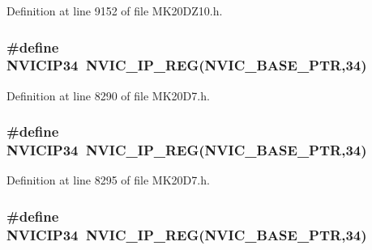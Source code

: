 Definition at line 9152 of file M\+K20\+D\+Z10.\+h.

\subsubsection[{\texorpdfstring{N\+V\+I\+C\+I\+P34}{NVICIP34}}]{\setlength{\rightskip}{0pt plus 5cm}\#define N\+V\+I\+C\+I\+P34~{\bf N\+V\+I\+C\+\_\+\+I\+P\+\_\+\+R\+EG}({\bf N\+V\+I\+C\+\_\+\+B\+A\+S\+E\+\_\+\+P\+TR},34)}\hypertarget{group___n_v_i_c___register___accessor___macros_ga388622c516a5ca80deee995b2fc61b3b}{}\label{group___n_v_i_c___register___accessor___macros_ga388622c516a5ca80deee995b2fc61b3b}


Definition at line 8290 of file M\+K20\+D7.\+h.

\subsubsection[{\texorpdfstring{N\+V\+I\+C\+I\+P34}{NVICIP34}}]{\setlength{\rightskip}{0pt plus 5cm}\#define N\+V\+I\+C\+I\+P34~{\bf N\+V\+I\+C\+\_\+\+I\+P\+\_\+\+R\+EG}({\bf N\+V\+I\+C\+\_\+\+B\+A\+S\+E\+\_\+\+P\+TR},34)}\hypertarget{group___n_v_i_c___register___accessor___macros_ga388622c516a5ca80deee995b2fc61b3b}{}\label{group___n_v_i_c___register___accessor___macros_ga388622c516a5ca80deee995b2fc61b3b}


Definition at line 8295 of file M\+K20\+D7.\+h.

\subsubsection[{\texorpdfstring{N\+V\+I\+C\+I\+P34}{NVICIP34}}]{\setlength{\rightskip}{0pt plus 5cm}\#define N\+V\+I\+C\+I\+P34~{\bf N\+V\+I\+C\+\_\+\+I\+P\+\_\+\+R\+EG}({\bf N\+V\+I\+C\+\_\+\+B\+A\+S\+E\+\_\+\+P\+TR},34)}\hypertarget{group___n_v_i_c___register___accessor___macros_ga388622c516a5ca80deee995b2fc61b3b}{}\label{group___n_v_i_c___register___accessor___macros_ga388622c516a5ca80deee995b2fc61b3b}


